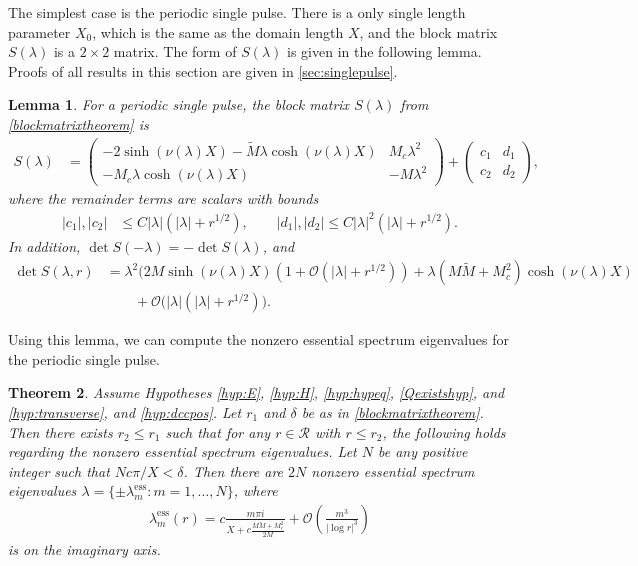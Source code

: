 \documentclass[12pt]{elsarticle}
\theoremstyle{plain}
\newtheorem{theorem}{Theorem}
\newtheorem{lemma}[theorem]{Lemma}
\theoremstyle{definition}
\theoremstyle{remark}
\numberwithin{theorem}{section}
\numberwithin{equation}{section}
\begin{document}
The simplest case is the periodic single pulse. There is a only single length parameter $X_0$, which is the same as the domain length $X$, and the block matrix $S(\lambda)$ is a $2\times 2$ matrix. The form of $S(\lambda)$ is given in the following lemma. Proofs of all results in this section are given in \cref{sec:singlepulse}. 

\begin{lemma}\label{lemma:1blockmatrix}
For a periodic single pulse, the block matrix $S(\lambda)$ from \cref{blockmatrixtheorem} is 
\begin{align}\label{1pblockmatrix}
S(\lambda) &= 
\begin{pmatrix}
-2 \sinh(\nu(\lambda) X) - \tilde{M}\lambda \cosh(\nu(\lambda) X) & M_c \lambda^2 \\
-M_c \lambda \cosh(\nu(\lambda)X) & - M \lambda^2
\end{pmatrix} +
\begin{pmatrix}
c_1 & d_1 \\ c_2 & d_2
\end{pmatrix},
\end{align}
where the remainder terms are scalars with bounds
\begin{align*}
|c_1|, |c_2| &\leq C |\lambda|(|\lambda| + r^{1/2}), \qquad |d_1|, |d_2| \leq C |\lambda|^2(|\lambda| + r^{1/2}).
\end{align*}
In addition, $\det S(-\lambda) = -\det S(\lambda)$, and 
\begin{equation}\label{1pblockmatrixdet}
\begin{aligned}
\det S(\lambda, r) &= \lambda^2 \Big( 2 M \sinh(\nu(\lambda)X)(1 + \mathcal{O}(|\lambda| + r^{1/2} )) + \lambda(M \tilde{M} + M_c^2 )\cosh(\nu(\lambda)X) \\
&\qquad+ \mathcal{O}(|\lambda|(|\lambda| + r^{1/2} ) \Big).
\end{aligned}
\end{equation}
\end{lemma}

\noi Using this lemma, we can compute the nonzero essential spectrum eigenvalues for the periodic single pulse.

\begin{theorem}\label{theorem:1pess}
Assume Hypotheses \ref{hyp:E}, \ref{hyp:H}, \ref{hyp:hypeq}, \ref{Qexistshyp}, and \ref{hyp:transverse}, and \ref{hyp:dccpos}. Let $r_1$ and $\delta$ be as in \cref{blockmatrixtheorem}. Then there exists $r_2 \leq r_1$ such that for any $r \in \mathcal{R}$ with $r \leq r_2$, the following holds regarding the nonzero essential spectrum eigenvalues. Let $N$ be any positive integer such that $N c \pi/X < \delta$. Then there are $2N$ nonzero essential spectrum eigenvalues $\lambda = \{ \pm \lambda_m^{\text{ess}} : m = 1, \dots, N \}$, where
\begin{align}\label{1pess}
\lambda_m^{\text{ess}}(r) = c \frac{m \pi i}{X + c \frac{M\tilde{M} + M_c^2 }{2 M}} +  \mathcal{O}\left( \frac{m^3}{|\log r|^3} \right)
\end{align}
is on the imaginary axis.
\end{theorem}
\end{document}

